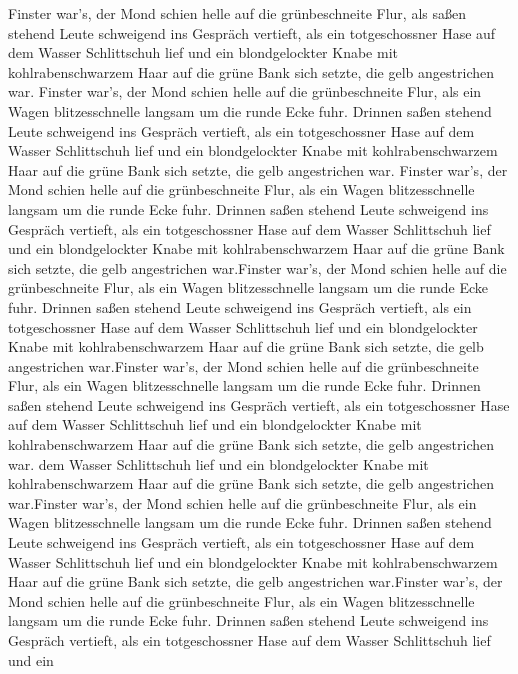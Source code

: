\documentclass[12pt]{g-brief}
\begin{document}
\begin{g-brief}
\begin{tabularx}{\textwidth}{@{}X@{}X@{}}
\end{tabularx}


Finster war's, der Mond schien helle auf die grünbeschneite Flur, als 
saßen stehend Leute schweigend ins Gespräch vertieft, als ein
totgeschossner Hase auf dem Wasser Schlittschuh lief und ein
blondgelockter Knabe mit kohlrabenschwarzem Haar auf die grüne Bank
sich setzte, die gelb angestrichen war.
Finster war's, der Mond schien helle auf die grünbeschneite Flur, als
ein Wagen blitzesschnelle langsam um die runde Ecke fuhr. Drinnen
saßen stehend Leute schweigend ins Gespräch vertieft, als ein
totgeschossner Hase auf dem Wasser Schlittschuh lief und ein
blondgelockter Knabe mit kohlrabenschwarzem Haar auf die grüne Bank
sich setzte, die gelb angestrichen war.
Finster war's, der Mond schien helle auf die grünbeschneite Flur, als
ein Wagen blitzesschnelle langsam um die runde Ecke fuhr. Drinnen
saßen stehend Leute schweigend ins Gespräch vertieft, als ein
totgeschossner Hase auf dem Wasser Schlittschuh lief und ein
blondgelockter Knabe mit kohlrabenschwarzem Haar auf die grüne Bank
sich setzte, die gelb angestrichen war.Finster war's, der Mond schien helle auf die grünbeschneite Flur, als
ein Wagen blitzesschnelle langsam um die runde Ecke fuhr. Drinnen
saßen stehend Leute schweigend ins Gespräch vertieft, als ein
totgeschossner Hase auf dem Wasser Schlittschuh lief und ein
blondgelockter Knabe mit kohlrabenschwarzem Haar auf die grüne Bank
sich setzte, die gelb angestrichen war.Finster war's, der Mond schien helle auf die grünbeschneite Flur, als
ein Wagen blitzesschnelle langsam um die runde Ecke fuhr. Drinnen
saßen stehend Leute schweigend ins Gespräch vertieft, als ein
totgeschossner Hase auf dem Wasser Schlittschuh lief und ein
blondgelockter Knabe mit kohlrabenschwarzem Haar auf die grüne Bank
sich setzte, die gelb angestrichen war. dem Wasser Schlittschuh lief und ein
blondgelockter Knabe mit kohlrabenschwarzem Haar auf die grüne Bank
sich setzte, die gelb angestrichen war.Finster war's, der Mond schien helle auf die grünbeschneite Flur, als
ein Wagen blitzesschnelle langsam um die runde Ecke fuhr. Drinnen
saßen stehend Leute schweigend ins Gespräch vertieft, als ein
totgeschossner Hase auf dem Wasser Schlittschuh lief und ein
blondgelockter Knabe mit kohlrabenschwarzem Haar auf die grüne Bank
sich setzte, die gelb angestrichen war.Finster war's, der Mond schien helle auf die grünbeschneite Flur, als
ein Wagen blitzesschnelle langsam um die runde Ecke fuhr. Drinnen
saßen stehend Leute schweigend ins Gespräch vertieft, als ein
totgeschossner Hase auf dem Wasser Schlittschuh lief und ein

\end{g-brief}
\end{document}
